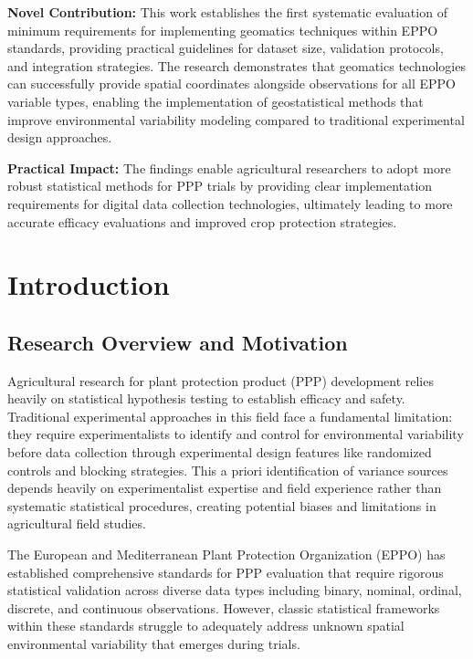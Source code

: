 \documentclass[12pt,a4paper,oneside]{report}
\begin{document}
{\textbf{Novel Contribution:} This work establishes the first systematic evaluation of minimum requirements for implementing geomatics techniques within EPPO standards, providing practical guidelines for dataset size, validation protocols, and integration strategies. The research demonstrates that geomatics technologies can successfully provide spatial coordinates alongside observations for all EPPO variable types, enabling the implementation of geostatistical methods that improve environmental variability modeling compared to traditional experimental design approaches.

\textbf{Practical Impact:} The findings enable agricultural researchers to adopt more robust statistical methods for PPP trials by providing clear implementation requirements for digital data collection technologies, ultimately leading to more accurate efficacy evaluations and improved crop protection strategies.}

\clearpage

\tableofcontents
\newpage

\chapter{Introduction}

\section{Research Overview and Motivation}

Agricultural research for plant protection product (PPP) development relies heavily on statistical hypothesis testing to establish efficacy and safety. Traditional experimental approaches in this field face a fundamental limitation: they require experimentalists to identify and control for environmental variability before data collection through experimental design features like randomized controls and blocking strategies. This a priori identification of variance sources depends heavily on experimentalist expertise and field experience rather than systematic statistical procedures, creating potential biases and limitations in agricultural field studies.

The European and Mediterranean Plant Protection Organization (EPPO) has established comprehensive standards for PPP evaluation that require rigorous statistical validation across diverse data types including binary, nominal, ordinal, discrete, and continuous observations. However, classic statistical frameworks within these standards struggle to adequately address unknown spatial environmental variability that emerges during trials.
\end{document}
